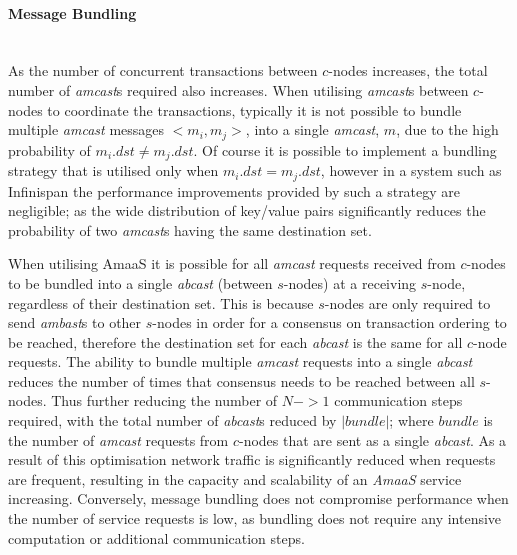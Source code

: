 		\paragraph{Message Bundling} \hspace{0pt} \\
		As the number of concurrent transactions between $c$-nodes increases, the total number of \emph{amcast}s required also increases.  When utilising \emph{amcast}s between $c$-nodes to coordinate the transactions, typically it is not possible to bundle multiple \emph{amcast} messages $<m_i, m_j>$, into a single \emph{amcast}, $m$, due to the high probability of $m_i.dst \neq m_j.dst$.  Of course it is possible to implement a bundling strategy that is utilised only when $m_i.dst = m_j.dst$, however in a system such as Infinispan the performance improvements provided by such a strategy are negligible; as the wide distribution of key/value pairs significantly reduces the probability of two \emph{amcast}s having the same destination set.  
		
		When utilising \textsf{AmaaS} it is possible for all \emph{amcast} requests received from $c$-nodes to be bundled into a single \emph{abcast} (between $s$-nodes) at a receiving $s$-node, regardless of their destination set.  This is because $s$-nodes are only required to send \emph{ambast}s to other $s$-nodes in order for a consensus on transaction ordering to be reached, therefore the destination set for each \emph{abcast} is the same for all $c$-node requests.   The ability to bundle multiple \emph{amcast} requests into a single \emph{abcast} reduces the number of times that consensus needs to be reached between all $s$-nodes.  Thus further reducing the number of $N->1$ communication steps required, with the total number of \emph{abcast}s reduced by $\left\vert bundle \right\vert$; where $bundle$ is the number of  \emph{amcast} requests from $c$-nodes that are sent as a single \emph{abcast}.  As a result of this optimisation network traffic is significantly reduced when requests are frequent, resulting in the capacity and scalability of an \emph{AmaaS} service increasing. Conversely, message bundling does not compromise performance when the number of service requests is low, as bundling does not require any intensive computation or additional communication steps.  
		
